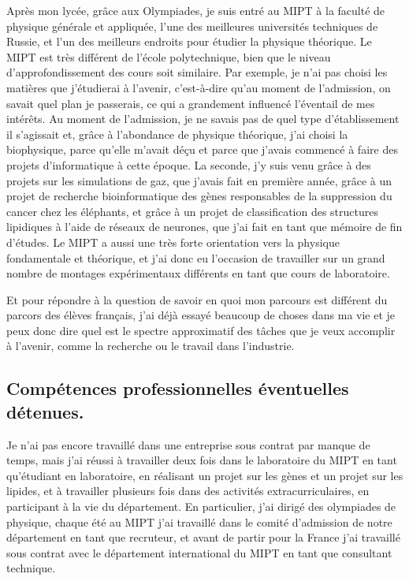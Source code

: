 \documentclass[a4paper,12pt]{article}
\begin{document}
Après mon lycée, grâce aux Olympiades, je suis entré au MIPT à la faculté de physique générale et appliquée, l'une des meilleures universités techniques de Russie, et l'un des meilleurs endroits pour étudier la physique théorique. Le MIPT est très différent de l'école polytechnique, bien que le niveau d'approfondissement des cours soit similaire. Par exemple, je n'ai pas choisi les matières que j'étudierai à l'avenir, c'est-à-dire qu'au moment de l'admission, on savait quel plan je passerais, ce qui a grandement influencé l'éventail de mes intérêts. Au moment de l'admission, je ne savais pas de quel type d'établissement il s'agissait et, grâce à l'abondance de physique théorique, j'ai choisi la biophysique, parce qu'elle m'avait déçu et parce que j'avais commencé à faire des projets d'informatique à cette époque. La seconde, j'y suis venu grâce à des projets sur les simulations de gaz, que j'avais fait en première année, grâce à un projet de recherche bioinformatique des gènes responsables de la suppression du cancer chez les éléphants, et grâce à un projet de classification des structures lipidiques à l'aide de réseaux de neurones, que j'ai fait en tant que mémoire de fin d'études. Le MIPT a aussi une très forte orientation vers la physique fondamentale et théorique, et j'ai donc eu l'occasion de travailler sur un grand nombre de montages expérimentaux différents en tant que cours de laboratoire. 

Et pour répondre à la question de savoir en quoi mon parcours est différent du parcors des élèves français, j'ai déjà essayé beaucoup de choses dans ma vie et je peux donc dire quel est le spectre approximatif des tâches que je veux accomplir à l'avenir, comme la recherche ou le travail dans l'industrie.

\subsection{Compétences professionnelles éventuelles détenues.}

Je n'ai pas encore travaillé dans une entreprise sous contrat par manque de temps, mais j'ai réussi à travailler deux fois dans le laboratoire du MIPT en tant qu'étudiant en laboratoire, en réalisant un projet sur les gènes et un projet sur les lipides, et à travailler plusieurs fois dans des activités extracurriculaires, en participant à la vie du département. En particulier, j'ai dirigé des olympiades de physique, chaque été au MIPT j'ai travaillé dans le comité d'admission de notre département en tant que recruteur, et avant de partir pour la France j'ai travaillé sous contrat avec le département international du MIPT en tant que consultant technique. 
\end{document}
